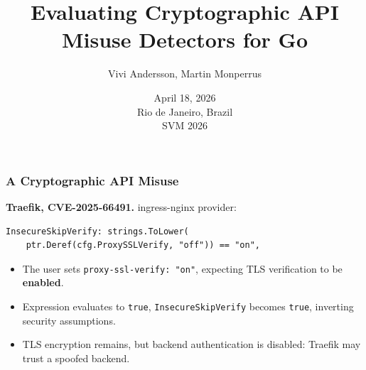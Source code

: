 \documentclass[10pt]{beamer}
\title[Crypto Misuse Detectors for Go]{\textbf{\LARGE Evaluating Cryptographic API Misuse Detectors for Go}}
\author[Andersson and Monperrus]{Vivi Andersson, Martin Monperrus}
\institute[KTH]{KTH Royal Institute of Technology, Stockholm, Sweden}
\date[18 Apr 2026]{April 18, 2026\\Rio de Janeiro, Brazil\\SVM 2026}
\begin{document}
\frame{\titlepage}


\begin{frame}[fragile]
    \frametitle{A Cryptographic API Misuse}
    {\large\textbf{Traefik, CVE-2025-66491.} ingress-nginx provider:}
    \vspace{0.5em}
        \begin{minipage}{0.78\textwidth}
        \begin{lstlisting}
InsecureSkipVerify: strings.ToLower(
    ptr.Deref(cfg.ProxySSLVerify, "off")) == "on",
        \end{lstlisting}
        \end{minipage}
    \vspace{0.2em}
    \normalsize
    \begin{itemize}
        \setlength{\itemsep}{0.5em}
        \item The user sets \texttt{proxy-ssl-verify: "on"}, expecting TLS verification to be \textbf{enabled}.
        \item Expression evaluates to \texttt{true}, \texttt{InsecureSkipVerify} becomes \texttt{true}, inverting security assumptions.
        \item TLS encryption remains, but backend authentication is disabled: Traefik may trust a spoofed backend.    
    \end{itemize}
\end{frame}

\end{document}
